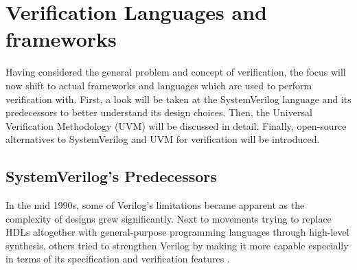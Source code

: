 \section{Verification Languages and frameworks} %

Having considered the general problem and concept of verification, the focus will now shift to actual frameworks and languages which are used to perform verification with. First, a look will be taken at the SystemVerilog language and its predecessors to better understand its design choices. Then, the Universal Verification Methodology (UVM) will be discussed in detail. Finally, open-source alternatives to SystemVerilog and UVM for verification will be introduced.

\subsection{SystemVerilog's Predecessors} %

In the mid 1990s, some of Verilog's limitations became apparent as the complexity of designs grew significantly. Next
to movements trying to replace HDLs altogether with general-purpose programming languages through high-level
synthesis, others tried to strengthen Verilog by making it more capable especially in terms of its specification and
verification features \cite[Sec. 6]{flake2020a}.

